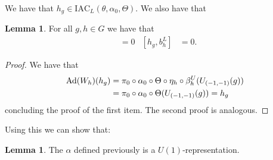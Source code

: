 \documentclass[12pt,a4paper,twoside]{article}
\newcommand{\IAC}{\textrm{IAC}}
\let\originalleft\left
\let\originalright\right
\renewcommand{\left}{\mathopen{}\mathclose\bgroup\originalleft}
\renewcommand{\right}{\aftergroup\egroup\originalright}
\newcommand{\Ad}[1]{\textrm{Ad}\left(#1\right)}
\theoremstyle{definition}
\newtheorem{lemma}[theorem]{Lemma}
\numberwithin{equation}{section}
\begin{document}
We have that $h_g\in\IAC_L(\theta,\alpha_0,\Theta)$. We also have that
\begin{lemma}\label{lem:W_g_And_h_g_Commute}
	For all $g,h\in G$ we have that
	\begin{align}
		[h_g,W_h]&=0&[h_g,b_h^L]&=0.
	\end{align}
\end{lemma}
\begin{proof}
	We have that
	\begin{align}
		\Ad{W_h}(h_g)&=\pi_0\circ\alpha_0\circ\Theta\circ\eta_h\circ\beta_h^U(U_{(-1,-1)}(g))\\
		&=\pi_0\circ\alpha_0\circ\Theta(U_{(-1,-1)}(g))=h_g
	\end{align}
	concluding the proof of the first item. The second proof is analogous.
\end{proof}
Using this we can show that:
\begin{lemma}
	The $\alpha$ defined previously is a $U(1)$-representation.
\end{lemma}
\end{document}
